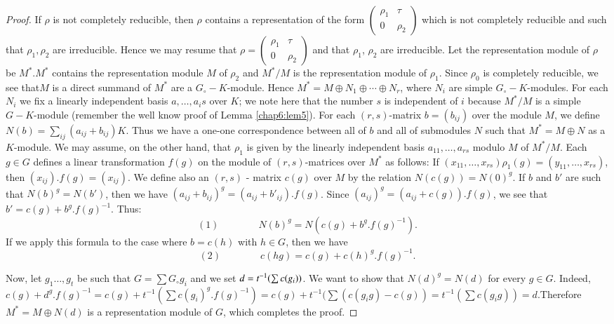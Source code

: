 \begin{proof}
  If $\rho$ is not completely reducible, then $\rho$ contains a
  representation of the form $\begin{pmatrix} \rho_1 & \tau \\ 0 &
    \rho_2 \end{pmatrix}$ which is not completely reducible and such
  that $\rho_1, \rho_2$ are irreducible.  Hence we may resume that
  $\rho = \begin{pmatrix}\rho_1 & \tau \\ 0 & \rho_2 \end{pmatrix}$ and
  that $\rho_1$, $\rho_2$ are irreducible.  Let the representation
  module of $\rho$ be $M^\ast. M^\ast$ contains the representation
  module $M$ of $\rho_2$ and $M^\ast/ M$ is the representation module
  of $\rho_1$.  Since $\rho_0$ is completely reducible, we see
  that\pageoriginale $M$ 
  is a direct summand of $M^\ast$ are a  $G_{\circ}-K$-module. Hence
  $M^\ast = M \oplus N_1 \oplus \cdots \oplus N_r$, where $N_i$  are
  simple $G_{\circ}-K$-modules. For each  $N_i$ we fix a linearly
  independent basis $a,\ldots,a_is$ over $K$; we note here that the
  number $s$ is independent of $i$ because $M^\ast /M$ is a simple
  $G-K$-module (remember the well know proof of Lemma \ref{chap6:lem5}).  For each
  $(r,s)$-matrix $b = (b_{ij})$ over the module $M$, we define $N(b)
  = \sum_{ij}(a_{ij}+b_{ij}) K$.  Thus we have a one-one
  correspondence between all of $b$ and all of submodules $N$ such
  that $M^\ast = M \oplus N$  as a $K$-module.  We may assume, on the
  other hand, that $\rho_1$ is given by the linearly independent basis
  $a_{11}, \ldots , a_{rs}$  modulo $M$ of $M^\ast/M$.  Each $g
  \in G$ defines a linear transformation $f(g)$ on the module of
  $(r,s)$-matrices over $M^\ast$ as follows: If $(x_{11},
  \ldots,x_{rs})  \rho_1 (g) = (y_{11}, \ldots, x_{rs})$, then
  $(x_{ij}). f(g) = (x_{ij})$.  We define also an $(r,s)$ - matrix
  $c(g)$ over $M$ by the relation $N(c(g))= N(0)^g$.  If $b$ and  $b'$
  are such that $N(b)^g=N(b')$, then we have $(a_{ij}+b_{ij})^g =
  (a_{ij}+b'_{ij}). f(g)$. Since  $(a_{ij})^g = (a_{ij}+c(g)).f(g)$,
  we see that $b'=c(g) + b^g. f(g)^{-1}$. Thus: 
  $$
(1) \qquad \qquad  N(b)^g= N(c (g) + b^g.f(g)^{-1}).
  $$
  If we apply this formula to the case where $b=c(h)$  with $h
  \in G$, then we have 
$$
 (2) \qquad \qquad  c(hg)= c(g) + c(h)^g. f(g)^{-1}.
  $$

Now, let $g_1 \ldots, g_t$  be such that $G=\sum G_{\circ} g_i$ and we
set   $d=t^{-1}\break (\sum c(g_i))$.  We want to show that $N(d)^g = N(d)$
for every $g\in G$.  Indeed, $c(g) + d^g. f(g)^{-1} = c(g) +
t^{-1}(\sum c(g_i)^g. f(g)^{-1}) = c(g) + t^{-1} (\sum(c(g_i
g)-c(g))=t^{-1}(\sum c(g_i g))=d$.\pageoriginale  Therefore $M^\ast =
M \oplus N (d)$ is a representation module of $G$, which completes the
proof.  
\end{proof}

